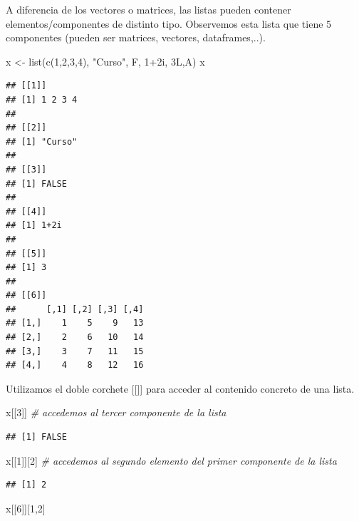 \documentclass[
]{book}
\newenvironment{Shaded}{\begin{snugshade}}{\end{snugshade}}
\newcommand{\CommentTok}[1]{\textcolor[rgb]{0.56,0.35,0.01}{\textit{#1}}}
\newcommand{\DecValTok}[1]{\textcolor[rgb]{0.00,0.00,0.81}{#1}}
\newcommand{\FunctionTok}[1]{\textcolor[rgb]{0.00,0.00,0.00}{#1}}
\newcommand{\NormalTok}[1]{#1}
\newcommand{\OtherTok}[1]{\textcolor[rgb]{0.56,0.35,0.01}{#1}}
\newcommand{\SpecialCharTok}[1]{\textcolor[rgb]{0.00,0.00,0.00}{#1}}
\newcommand{\StringTok}[1]{\textcolor[rgb]{0.31,0.60,0.02}{#1}}
\begin{document}
A diferencia de los vectores o matrices, las listas pueden contener elementos/componentes de distinto tipo. Observemos esta lista que tiene 5 componentes (pueden ser matrices, vectores, dataframes,..).

\begin{Shaded}
\begin{Highlighting}[]
\NormalTok{x }\OtherTok{\textless{}{-}} \FunctionTok{list}\NormalTok{(}\FunctionTok{c}\NormalTok{(}\DecValTok{1}\NormalTok{,}\DecValTok{2}\NormalTok{,}\DecValTok{3}\NormalTok{,}\DecValTok{4}\NormalTok{), }\StringTok{"Curso"}\NormalTok{, F, }\DecValTok{1}\SpecialCharTok{+}\NormalTok{2i, 3L,A)}
\NormalTok{x}
\end{Highlighting}
\end{Shaded}

\begin{verbatim}
## [[1]]
## [1] 1 2 3 4
## 
## [[2]]
## [1] "Curso"
## 
## [[3]]
## [1] FALSE
## 
## [[4]]
## [1] 1+2i
## 
## [[5]]
## [1] 3
## 
## [[6]]
##      [,1] [,2] [,3] [,4]
## [1,]    1    5    9   13
## [2,]    2    6   10   14
## [3,]    3    7   11   15
## [4,]    4    8   12   16
\end{verbatim}

Utilizamos el doble corchete {[}{[}{]}{]} para acceder al contenido concreto de una lista.

\begin{Shaded}
\begin{Highlighting}[]
\NormalTok{x[[}\DecValTok{3}\NormalTok{]]  }\CommentTok{\# accedemos al tercer componente de la lista}
\end{Highlighting}
\end{Shaded}

\begin{verbatim}
## [1] FALSE
\end{verbatim}

\begin{Shaded}
\begin{Highlighting}[]
\NormalTok{x[[}\DecValTok{1}\NormalTok{]][}\DecValTok{2}\NormalTok{] }\CommentTok{\# accedemos al segundo elemento del primer componente de la lista}
\end{Highlighting}
\end{Shaded}

\begin{verbatim}
## [1] 2
\end{verbatim}

\begin{Shaded}
\begin{Highlighting}[]
\NormalTok{x[[}\DecValTok{6}\NormalTok{]][}\DecValTok{1}\NormalTok{,}\DecValTok{2}\NormalTok{]}
\end{Highlighting}
\end{Shaded}
\end{document}
